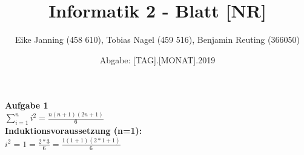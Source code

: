 \documentclass[11pt]{article}
\title{Informatik 2 - Blatt [NR]}
\author{Eike Janning (458 610), Tobias Nagel (459 516), Benjamin Reuting (366050)}
\date{Abgabe: [TAG].[MONAT].2019}
\begin{document}
\maketitle

\textbf{Aufgabe 1}\\

$\sum_{i=1}^{n} i^2 = \frac{n(n+1)(2n+1)}{6}$
\\
\textbf{Induktionsvoraussetzung (n=1):}\\
$i^2 = 1 = \frac{2*3}{6} = \frac{1(1+1)(2*1+1)}{6}$
\end{document}
